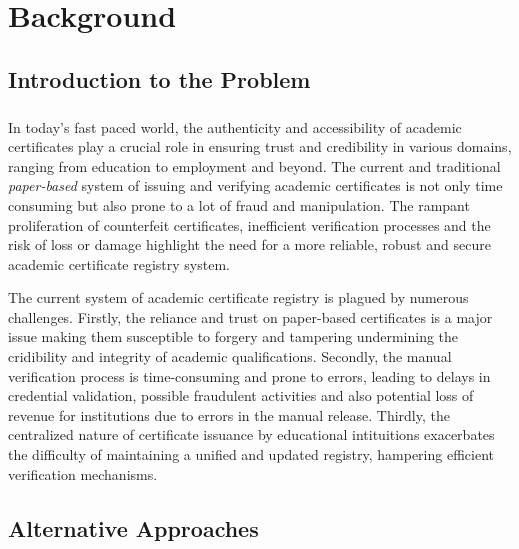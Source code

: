 %
%
\chapter{Background}\label{chap:background}


\section{Introduction to the Problem}\label{sec:introduction-to-the-problem}
\paragraph{}

In today's fast paced world, the authenticity and accessibility of academic certificates play a crucial role in ensuring trust and credibility in various
domains, ranging from education to employment and beyond.
The current and traditional \textit{paper-based} system of issuing and verifying academic certificates is not only time consuming but also prone to a lot of fraud and manipulation.
The rampant proliferation of counterfeit certificates, inefficient verification processes and the risk of loss or damage highlight the need for a more reliable, robust and secure academic
certificate registry system.

The current system of academic certificate registry is plagued by numerous challenges. Firstly, the reliance and trust on paper-based certificates is a major issue
making them susceptible to forgery and tampering undermining the cridibility and integrity of academic qualifications. Secondly, the manual verification process is
time-consuming and prone to errors, leading to delays in credential validation, possible fraudulent activities and also potential loss of revenue for institutions due to
errors in the manual release. Thirdly, the centralized nature of certificate issuance by educational intituitions exacerbates the difficulty
of maintaining a unified and updated registry, hampering efficient verification mechanisms.

\section{Alternative Approaches}\label{sec:alternative-approaches}
\paragraph{}


